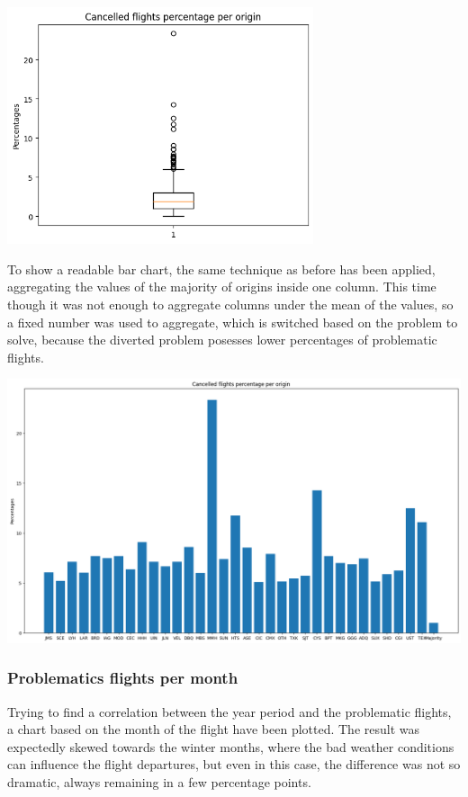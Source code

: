 \documentclass[
	letterpaper, %
	10pt, %
]{class}
\begin{document}
\begin{center}
    \includegraphics[width=9cm]{../images/cancelled_box_per_origin.png}
\end{center}

To show a readable bar chart, the same technique as before has been applied, aggregating the values of the majority of origins inside one column. This time though it was not enough to aggregate columns under the mean of the values, so a fixed number was used to aggregate, which is switched based on the problem to solve,
because the diverted problem posesses lower percentages of problematic flights.

\begin{center}
    \includegraphics[width=14cm]{../images/cancelled_per_origin.png}
\end{center}
\newpage

\subsubsection{Problematics flights per month}
Trying to find a correlation between the year period and the problematic flights, a chart based on the month of the flight have been plotted. The result was expectedly skewed towards the winter months, where the bad weather conditions can influence the flight departures, but even in this case, the difference was not so dramatic, always remaining in a few percentage points.
\end{document}
